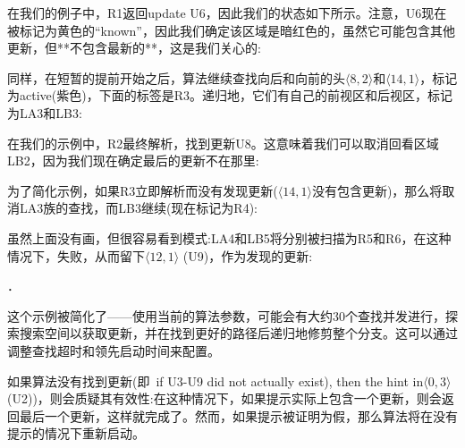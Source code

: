 在我们的例子中，R1返回update U6，因此我们的状态如下所示。注意，U6现在被标记为黄色的“known”，因此我们确定该区域是暗红色的，虽然它可能包含其他更新，但**不包含最新的**，这是我们关心的:


同样，在短暂的提前开始之后，算法继续查找向后和向前的头$\langle  8, 2 \rangle$和$\langle  14, 1 \rangle$，标记为active(紫色)，下面的标签是R3。递归地，它们有自己的前视区和后视区，标记为LA3和LB3:

在我们的示例中，R2最终解析，找到更新U8。这意味着我们可以取消回看区域LB2，因为我们现在确定最后的更新不在那里:


为了简化示例，如果R3立即解析而没有发现更新($\langle  14, 1 \rangle$没有包含更新)，那么将取消LA3族的查找，而LB3继续(现在标记为R4):


虽然上面没有画，但很容易看到模式:LA4和LB5将分别被扫描为R5和R6，在这种情况下，失败，从而留下$\langle  12, 1 \rangle$ (U9)，作为发现的更新:


．

这个示例被简化了——使用当前的算法参数，可能会有大约30个查找并发进行，探索搜索空间以获取更新，并在找到更好的路径后递归地修剪整个分支。这可以通过调整查找超时和领先启动时间来配置。

如果算法没有找到更新(即\ if U3-U9 did not actually exist), then the hint in$\langle  0, 3 \rangle$ (U2))，则会质疑其有效性:在这种情况下，如果提示实际上包含一个更新，则会返回最后一个更新，这样就完成了。然而，如果提示被证明为假，那么算法将在没有提示的情况下重新启动。


% 


